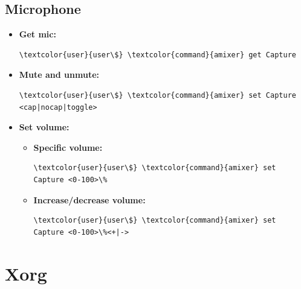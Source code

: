 \documentclass[10pt, a4paper, onecolumn, oneside, titlepage, openany]{book}
\begin{document}
\section{Microphone}
\begin{itemize}
    \item \textbf{Get mic:}
\begin{Verbatim}[commandchars=\\\{\}]
\textcolor{user}{user\$} \textcolor{command}{amixer} get Capture
\end{Verbatim}
    \item \textbf{Mute and unmute:}
\begin{Verbatim}[commandchars=\\\{\}]
\textcolor{user}{user\$} \textcolor{command}{amixer} set Capture <cap|nocap|toggle>
\end{Verbatim}
    \item \textbf{Set volume:}
    \begin{itemize}
        \item \textbf{Specific volume:}
\begin{Verbatim}[commandchars=\\\{\}]
\textcolor{user}{user\$} \textcolor{command}{amixer} set Capture <0-100>\%
\end{Verbatim}        
        \item \textbf{Increase/decrease volume:}
\begin{Verbatim}[commandchars=\\\{\}]
\textcolor{user}{user\$} \textcolor{command}{amixer} set Capture <0-100>\%<+|->
\end{Verbatim}   
    \end{itemize}
\end{itemize}


\chapter{Xorg}
\end{document}
